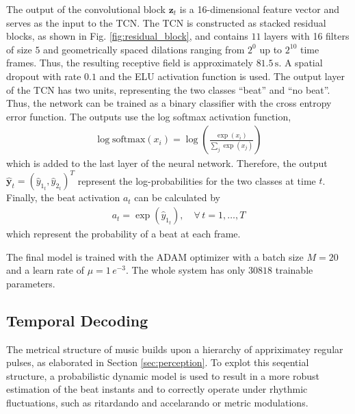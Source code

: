 \documentclass{scrartcl}
\begin{document}
The output of the convolutional block $\mathbf z_t$ is a 16-dimensional feature vector and serves as the input to the TCN. The TCN is constructed as stacked residual blocks, as shown in Fig. \ref{fig:residual_block}, and contains $11$ layers with 16 filters of size $5$ and geometrically spaced dilations ranging from $2^0$ up to $2^{10}$ time frames. Thus, the resulting receptive field is approximately $81.5\,\text{s}$. A spatial dropout with rate $0.1$ and the ELU activation function is used. The output layer of the TCN has two units, representing the two classes ``beat'' and ``no beat''. Thus, the network can be trained as a binary classifier with the cross entropy error function. The outputs use the log softmax activation function, 
\begin{align}
\log \text{softmax}(x_i) = \log\left(\frac{\exp{(x_i)}}{\sum_j \exp(x_j)}\right)
\end{align} 
which is added to the last layer of the neural network. Therefore, the output $\hat{\mathbf y}_t = (\hat{y}_{1_t}, \hat{y}_{2_t})^T$ represent the log-probabilities for the two classes at time $t$. Finally, the beat activation $a_t$ can be calculated by
\begin{align}
a_t = \exp \left({\hat{y}_{1_t}} \right), \quad \forall \, t= 1,\dots,T
\end{align}  
which represent the probability of a beat at each frame.

The final model is trained with the ADAM optimizer \cite{Kingma2014} with a batch size $M = 20$ and a learn rate of $\mu = 1 \,e^{-3}$. The whole system has only $30818$ trainable parameters. 





\subsection{Temporal Decoding}
\label{sec:temporal_decoding}

The metrical structure of music builds upon a hierarchy of appriximatey regular pulses, as elaborated in Section \ref{sec:perception}. To explot this seqential structure, a probabilistic dynamic model is used to result in a more robust estimation of the beat instants and to correctly operate under rhythmic fluctuations, such as ritardando and accelarando or metric modulations.
\end{document}
